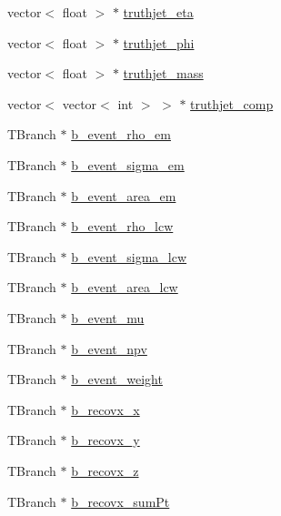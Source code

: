 \begin{DoxyCompactItemize}
vector$<$ float $>$ $\ast$ \hyperlink{classXMLWriter_a560f9f50b116173e75824910d6f8015f}{truthjet\+\_\+eta}
\item 
vector$<$ float $>$ $\ast$ \hyperlink{classXMLWriter_a59119372356b52c70ed218b895babe29}{truthjet\+\_\+phi}
\item 
vector$<$ float $>$ $\ast$ \hyperlink{classXMLWriter_a74acc20582f56341fefed138c1354381}{truthjet\+\_\+mass}
\item 
vector$<$ vector$<$ int $>$ $>$ $\ast$ \hyperlink{classXMLWriter_a5acd9fa2dadf536f05d82293bae9e0c9}{truthjet\+\_\+comp}
\item 
T\+Branch $\ast$ \hyperlink{classXMLWriter_ae4695101ba15163daa0dc97fceea6c06}{b\+\_\+event\+\_\+rho\+\_\+em}
\item 
T\+Branch $\ast$ \hyperlink{classXMLWriter_ad2b5032b679ef086fe126712c80ae776}{b\+\_\+event\+\_\+sigma\+\_\+em}
\item 
T\+Branch $\ast$ \hyperlink{classXMLWriter_a19ec672d402230ee6c2dd00deaa21ee5}{b\+\_\+event\+\_\+area\+\_\+em}
\item 
T\+Branch $\ast$ \hyperlink{classXMLWriter_ade7fba261d0a1414620885cbba228f9e}{b\+\_\+event\+\_\+rho\+\_\+lcw}
\item 
T\+Branch $\ast$ \hyperlink{classXMLWriter_acc73b297d8ac7767ad0a52a5814f4751}{b\+\_\+event\+\_\+sigma\+\_\+lcw}
\item 
T\+Branch $\ast$ \hyperlink{classXMLWriter_a25cd9d012c2eb290bfa8d77e9b06f9fc}{b\+\_\+event\+\_\+area\+\_\+lcw}
\item 
T\+Branch $\ast$ \hyperlink{classXMLWriter_a7eb0cbe0258b88f26a292bdd842b6779}{b\+\_\+event\+\_\+mu}
\item 
T\+Branch $\ast$ \hyperlink{classXMLWriter_a335b06a9a0e5627cf0d9792f42c6ae09}{b\+\_\+event\+\_\+npv}
\item 
T\+Branch $\ast$ \hyperlink{classXMLWriter_a47906db652e0aa66f7a7b949ff843946}{b\+\_\+event\+\_\+weight}
\item 
T\+Branch $\ast$ \hyperlink{classXMLWriter_a09db291df0788ae57e32df5b60ca0d65}{b\+\_\+recovx\+\_\+x}
\item 
T\+Branch $\ast$ \hyperlink{classXMLWriter_aa860b1a94c9e14ce624a3fd3868f7daa}{b\+\_\+recovx\+\_\+y}
\item 
T\+Branch $\ast$ \hyperlink{classXMLWriter_ab9c90d4f2633d35686b422b9992ca79b}{b\+\_\+recovx\+\_\+z}
\item 
T\+Branch $\ast$ \hyperlink{classXMLWriter_a23d126233332578856c2406c4c7a6386}{b\+\_\+recovx\+\_\+sum\+Pt}
\item 

\end{DoxyCompactItemize}
